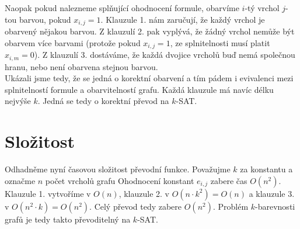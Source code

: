 \documentclass{scrartcl}
\begin{document}
Naopak pokud nalezneme splňující ohodnocení formule, obarvíme $i$-tý vrchol $j$-tou barvou, pokud $x_{i,j} = 1$. Klauzule 1. nám zaručují, že každý vrchol je obarvený nějakou barvou. Z klauzulí 2. pak vyplývá, že žádný vrchol nemůže být obarvem více barvami (protože pokud $x_{i,j} = 1$, ze splnitelnosti musí platit $x_{i,m} = 0$). Z klauzulí 3. dostáváme, že každá dvojice vrcholů buď nemá společnou hranu, nebo není obarvena stejnou barvou.\\

Ukázali jsme tedy, že se jedná o korektní obarvení a tím pádem i evivalenci mezi splnitelností formule a obarvitelností grafu. Každá klauzule má navíc délku nejvýše $k$. Jedná se tedy o korektní převod na $k$-SAT.

\section{Složitost}
Odhadněme nyní časovou složitost převodní funkce. Považujme $k$ za konstantu a označme $n$ počet vrcholů grafu Ohodnocení konstant $e_{i,j}$ zabere čas $O(n^2)$. Klauzule 1. vytvoříme v $O(n)$, klauzule 2. v $O(n \cdot k^2) = O(n)$ a klauzule 3. v $O(n^2 \cdot k) = O(n^2)$. Celý převod tedy zabere $O(n^2)$. Problém $k$-barevnosti grafů je tedy takto převoditelný na $k$-SAT.
\end{document}
